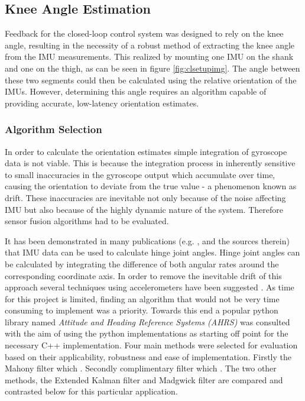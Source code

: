 \subsection{Knee Angle Estimation}
Feedback for the closed-loop control system was designed to rely on the knee angle, resulting in the necessity of a robust method of extracting the knee angle from the IMU measurements. This realized by mounting one IMU on the shank and one on the thigh, as can be seen in figure \ref{fig:clsetupimg}. The angle between these two segments could then be calculated using the relative orientation of the IMUs. However, determining this angle requires an algorithm capable of providing accurate, low-latency orientation estimates. 


\subsubsection{Algorithm Selection}
In order to calculate the orientation estimates simple integration of gyroscope data is not viable. This is because the integration process in inherently sensitive to small inaccuracies in the gyroscope output which accumulate over time, causing the orientation to deviate from the true value - a phenomenon known as drift. These inaccuracies are inevitable not only because of the noise affecting IMU but also because of the highly dynamic nature of the system. Therefore sensor fusion algorithms had to be evaluated.

It has been demonstrated in many publications (e.g. \cite{peng_cheng_joint-angle_2010}, \cite{sabatini_estimating_2011} and the sources therein) that IMU data can be used to calculate hinge joint angles. Hinge joint angles can be calculated by integrating the difference of both angular rates around the corresponding coordinate axis. In order to remove the inevitable drift of this approach several techniques using accelerometers have been suggested \cite{peng_cheng_joint-angle_2010}. As time for this project is limited, finding an algorithm that would not be very time consuming to implement was a priority. Towards this end a popular python library named \textit{Attitude and Heading Reference Systems (AHRS)} \cite{noauthor_ahrs_nodate} was consulted with the aim of using the python implementations as starting off point for the necessary C++ implementation. Four main methods were selected for evaluation based on their applicability, robustness and ease of implementation. Firstly the Mahony filter  which . Secondly complimentary filter  which . The two other methods, the Extended Kalman filter and Madgwick filter are compared and contrasted below for this particular application. 

